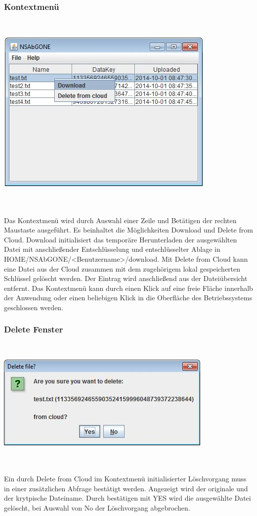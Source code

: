 \documentclass[13pt,a4paper,bibliography=totocnumbered,listof=totocnumbered]{scrartcl}
\begin{document}
\subsubsection{Kontextmenü}
$\;$\\
\begin{minipage}{\linewidth}
	\centering
	\includegraphics[width=0.4\linewidth]{./img/Kontext.jpg}
	\label{Kontext}
\end{minipage}
\\\\Das Kontextmenü wird durch Auswahl einer Zeile und Betätigen der rechten Maustaste ausgeführt. Es beinhaltet die Möglichkeiten Download und Delete from Cloud. Download initialisiert das temporäre Herunterladen der ausgewählten Datei mit anschließender Entschlüsselung und entschlüsselter Ablage in HOME/NSAbGONE/\textless Benutzername\textgreater/download. Mit Delete from Cloud kann eine Datei aus der Cloud zusammen mit dem zugehörigem lokal gespeicherten Schlüssel gelöscht werden. Der Eintrag wird anschließend aus der Dateiübersicht entfernt. Das Kontextmenü kann durch einen Klick auf eine freie Fläche innerhalb der Anwendung oder einen beliebigen Klick in die Oberfläche des Betriebssystems geschlossen werden.

\subsubsection{Delete Fenster}
$\;$\\
\begin{minipage}{\linewidth}
	\centering
	\includegraphics[width=0.4\linewidth]{./img/Delete.jpg}
	\label{Delete}
\end{minipage}
\\\\Ein durch Delete from Cloud im Kontextmenü initialisierter Löschvorgang muss in einer zusätzlichen Abfrage bestätigt werden. Angezeigt wird der originale und der krytpische Dateiname. Durch bestätigen mit YES wird die ausgewählte Datei gelöscht, bei Auswahl von No der Löschvorgang abgebrochen.
\end{document}

